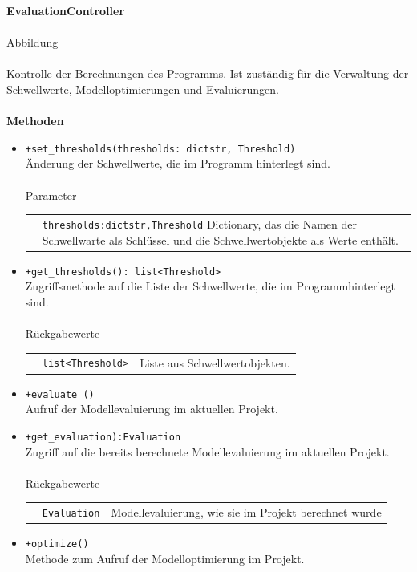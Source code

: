 \documentclass{article}
\begin{document}
\begin{itemize}
\newpage
\textbf{\large{EvaluationController}}\\\\Abbildung\\\\
Kontrolle der Berechnungen des Programms. Ist zuständig für die Verwaltung der Schwellwerte, Modelloptimierungen und Evaluierungen.\\\\
\textbf{\large{Methoden}}
\begin{itemize}
\item \texttt{+set\_thresholds(thresholds: dict{str, Threshold})}\\ Änderung der Schwellwerte, die im Programm hinterlegt sind.\\\\
\underline{{Parameter}}\\
\begin{tabular}{lp{10.7cm}}
 & \texttt{thresholds:dict{str,Threshold}} Dictionary, das die Namen der Schwellwarte als Schlüssel und die Schwellwertobjekte als Werte enthält. \\
\end{tabular}
\item \texttt{+get\_thresholds(): list<Threshold>}\\ Zugriffsmethode auf die Liste der Schwellwerte, die im Programmhinterlegt sind.\\\\
\underline{{Rückgabewerte}}\\
\begin{tabular}{lll}
 & \texttt{list<Threshold>} & Liste aus Schwellwertobjekten. \\
\end{tabular}
\item \texttt{+evaluate ()}\\ Aufruf der Modellevaluierung im aktuellen Projekt.
\item \texttt{+get\_evaluation):Evaluation}\\ Zugriff auf die bereits berechnete Modellevaluierung im aktuellen Projekt.\\\\
\underline{{Rückgabewerte}}\\
\begin{tabular}{lll}
 & \texttt{Evaluation} & Modellevaluierung, wie sie im Projekt berechnet wurde \\
\end{tabular}
\item \texttt{+optimize()}\\ Methode zum Aufruf der Modelloptimierung im Projekt.\\
\end{itemize}






\end{itemize}
\end{document}
